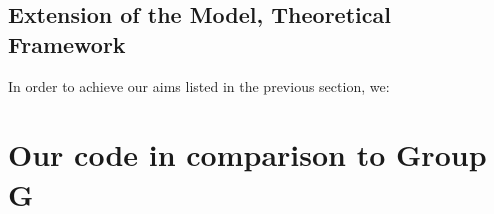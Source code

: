 \documentclass[a4paper, 12pt]{report}
\begin{document}
\section{Extension of the Model, Theoretical Framework}

In order to achieve our aims listed in the previous section, we:



\chapter{Our code in comparison to Group G}



\end{document}
